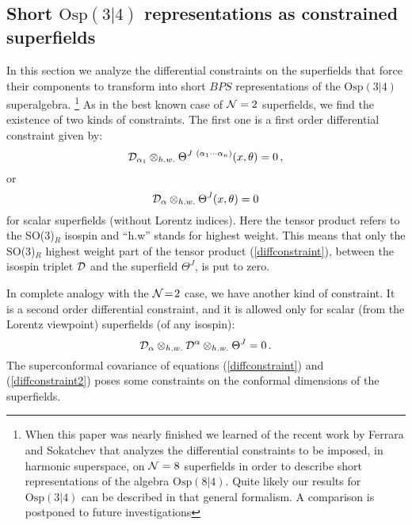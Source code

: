 \documentclass[a4paper,12pt]{article}
\begin{document}
\subsection{Short $\mathrm{Osp(3|4)}$ representations as constrained
superfields}
In this section we analyze the differential constraints on the
superfields that force their components to transform into short
$BPS$ representations of the $\mathrm{Osp(3|4)}$ superalgebra.
\footnote{When this paper was nearly finished we learned of the
recent work by Ferrara and Sokatchev \cite{fersoka} that analyzes
the differential constraints to be imposed, in harmonic superspace,
on ${\cal N}=8$ superfields in order to describe short representations
of the algebra $\mathrm{Osp(8|4)}$. Quite likely our results for
$\mathrm{Osp(3|4)}$ can be described in that general formalism.
A comparison is postponed to future investigations}
As in the best known case of ${\cal N}=2$ superfields, we find the
existence of two kinds of constraints.
The first one is a first order differential constraint given by:
\begin{equation}
{\cal D}_{\alpha_1}\otimes_{h.w.}
\Theta^{J\ (\alpha_1\cdots\alpha_n)}(x,\theta)=0\,,
\label{diffconstraint}
\end{equation}
or
\begin{equation}
  {\cal D}_{\alpha}\otimes_{h.w.}\Theta^{J}(x,\theta)=0
\label{diffconszero}
\end{equation}
for scalar superfields (without Lorentz indices).
Here the tensor product refers to the SO(3)$_R$ isospin and ``h.w''
stands for highest weight.
This means that only the SO(3)$_R$ highest weight part of the tensor
product (\ref{diffconstraint}), between the isospin triplet ${\cal D}$
and the superfield $\Theta^J$, is put to zero.
\par
In complete analogy with the ${\cal N}\!=\!2$ case, we have another
kind of constraint.
It is a second order differential constraint, and it is allowed only
for scalar (from the Lorentz viewpoint) superfields (of any isospin):
\begin{equation}
{\cal D}_\alpha\otimes_{h.w.}{\cal D}^\alpha\otimes_{h.w.}\Theta^J=0\,.
\label{diffconstraint2}
\end{equation}
The superconformal covariance of equations (\ref{diffconstraint}) and
(\ref{diffconstraint2}) poses some constraints on the conformal
dimensions of the superfields.
\end{document}
